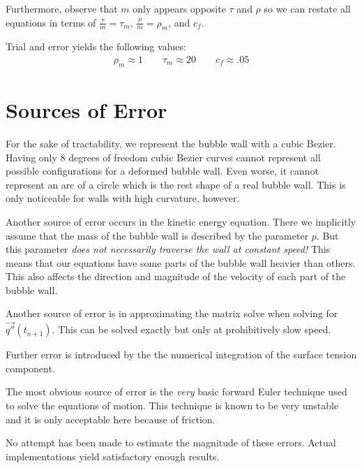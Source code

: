 \documentclass{article}
\begin{document}
Furthermore, observe that $m$ only appears opposite $\tau$ and
$\rho$ so we can restate all equations in terms of $\frac{\tau}{m}=\tau_m$,
$\frac{\rho}{m}=\rho_m$, and $c_f$.

Trial and error yields the following values:
\begin{align*}
\rho_m \approx 1 \qquad \tau_m \approx 20 \qquad c_f \approx .05 
\end{align*}
\clearpage
\section{Sources of Error}
For the sake of tractability, we represent the bubble wall with a
cubic Bezier. Having only 8 degrees of freedom cubic Bezier curves cannot
represent all possible configurations for a deformed bubble wall. Even
worse, it cannot represent an arc of a circle which is the rest shape of a real
bubble wall. This is only noticeable for walls with high curvature, however.

Another source of error occurs in the kinetic energy equation. There we
implicitly assume that the mass of the bubble wall is described by the
parameter $p$. But this parameter \emph{does not necessarily
traverse the wall at constant speed!} This means that our equations have some
parts of the bubble wall heavier than others. This also affects
the direction and magnitude of the velocity of each part of the bubble wall.

Another source of error is in approximating the matrix solve when solving for
$\vec{q''}(t_{n+1})$. This can be solved exactly but only at prohibitively slow
speed.

Further error is introduced by the the numerical integration of the surface
tension component.

The most obvious source of error is the \emph{very} basic forward Euler
technique used to solve the equations of motion. This technique is known to be
very unstable and it is only acceptable here because of friction.

No attempt has been made to estimate the magnitude of these errors. Actual
implementations yield satisfactory enough results.
\end{document}
